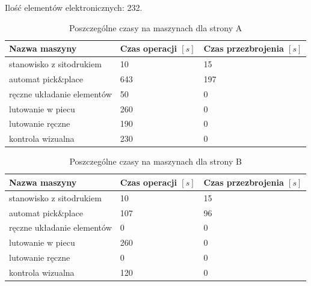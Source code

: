 \breakparagraph{}
Ilość elementów elektronicznych: 232.

\begin{table}[H]
	\centering
	\caption{Poszczególne czasy na maszynach dla strony A}
	\begin{tabular}{lll}
		\toprule
		Nazwa maszyny                 & Czas operacji $[s]$ & Czas przezbrojenia $[s]$ \\
		\midrule
		stanowisko z sitodrukiem      & 10                  & 15                       \\
		automat pick\&place           & 643                 & 197                      \\
		ręczne układanie elementów & 50                  & 0                        \\
		lutowanie w piecu             & 260                 & 0                        \\
		lutowanie ręczne             & 190                 & 0                        \\
		kontrola wizualna             & 230                 & 0                        \\
		\bottomrule
	\end{tabular}
\end{table}

\begin{table}[H]
	\centering
	\caption{Poszczególne czasy na maszynach dla strony B}
	\begin{tabular}{lll}
		\toprule
		Nazwa maszyny                 & Czas operacji $[s]$ & Czas przezbrojenia $[s]$ \\
		\midrule
		stanowisko z sitodrukiem      & 10                  & 15                       \\
		automat pick\&place           & 107                 & 96                       \\
		ręczne układanie elementów & 0                   & 0                        \\
		lutowanie w piecu             & 260                 & 0                        \\
		lutowanie ręczne             & 0                   & 0                        \\
		kontrola wizualna             & 120                 & 0                        \\
		\bottomrule
	\end{tabular}
\end{table}

